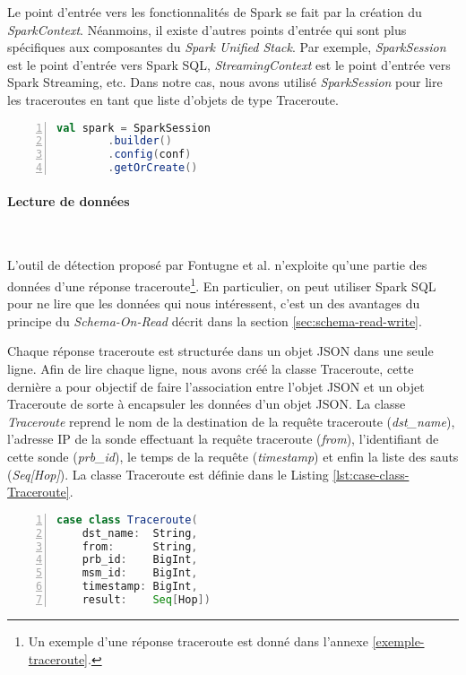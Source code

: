 Le point d'entrée vers les fonctionnalités de Spark se fait par la création du  \textit{SparkContext}. 
Néanmoins, il existe d'autres points d'entrée qui sont plus spécifiques aux composantes du \textit{Spark Unified Stack}. Par exemple,  \textit{SparkSession}  est le point d'entrée vers Spark SQL, \textit{StreamingContext} est le point d'entrée vers Spark Streaming, etc.
Dans notre cas, nous avons utilisé \textit{SparkSession} pour lire les traceroutes en tant que liste d'objets de type Traceroute.

\begin{lstlisting}[language=scala,firstnumber=1, caption={Creation d'une session Spark},label={lst:SparkSession-initiation}, basicstyle = \footnotesize,escapechar=|,numbers=left,
stepnumber=1]
val spark = SparkSession
		.builder()
		.config(conf)
		.getOrCreate()
\end{lstlisting}

\paragraph{Lecture de données}~

L'outil de détection proposé par  Fontugne et al. n'exploite qu'une partie des données d'une réponse traceroute\footnote{Un exemple d'une réponse  traceroute  est donné dans l'annexe \ref{exemple-traceroute}.}.
En particulier, on peut utiliser Spark SQL pour  ne lire que les données qui nous intéressent, c'est un des avantages du principe du \textit{Schema-On-Read} décrit dans la section \ref{sec:schema-read-write}. 

Chaque réponse traceroute est structurée dans un objet JSON dans une seule ligne. Afin de lire chaque ligne, nous avons créé la classe Traceroute, cette dernière  a pour objectif de faire l'association entre l'objet JSON  et un objet Traceroute de sorte à encapsuler les données d'un objet JSON. La classe \textit{Traceroute} reprend le nom de la destination de la requête traceroute (\textit{dst\_name}), l'adresse IP de la sonde effectuant la requête traceroute (\textit{from}), l'identifiant de cette sonde (\textit{prb\_id}), le temps de la requête (\textit{timestamp}) et enfin la liste des sauts (\textit{Seq[Hop]}). La classe Traceroute est définie dans le Listing \ref{lst:case-class-Traceroute}.


\begin{lstlisting}[language=scala,firstnumber=1, caption={Définition de la  classe Traceroute},label={lst:case-class-Traceroute}, basicstyle = \footnotesize,escapechar=|,numbers=left,
stepnumber=1]
case class Traceroute(
	dst_name:  String,
	from:      String,
	prb_id:    BigInt,
	msm_id:    BigInt,
	timestamp: BigInt,
	result:    Seq[Hop])
\end{lstlisting}

